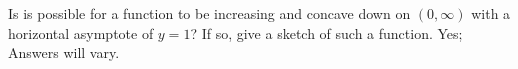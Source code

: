 {Is is possible for a function to be increasing and concave down on $(0,\infty)$ with a horizontal asymptote of $y=1$? If so, give a sketch of such a function.
}
{Yes; Answers will vary.
}

